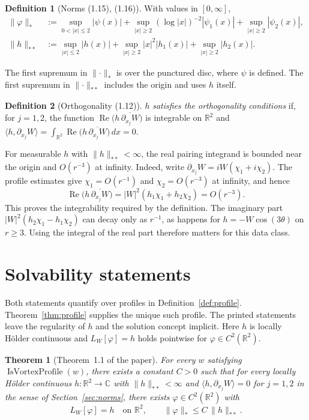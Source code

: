 \documentclass[11pt]{amsart}
\newtheorem{theorem}{Theorem}
\theoremstyle{definition}
\newtheorem{definition}{Definition}[section]
\newcommand{\C}{\mathbb{C}}
\newcommand{\R}{\mathbb{R}}
\renewcommand{\Re}{\operatorname{Re}}
\newcommand{\nstar}[1]{\lVert #1\rVert_{*}}
\newcommand{\nss}[1]{\lVert #1\rVert_{**}}
\newcommand{\ip}[2]{\langle #1,#2\rangle}
\newcommand{\vprofile}{\operatorname{IsVortexProfile}}
\begin{document}
\begin{definition}[Norms (1.15), (1.16)]
With values in $[0,\infty]$,
\begin{align*}
  \nstar{\varphi} &:= \sup_{0<|x|\le 2} |\psi(x)|
     + \sup_{|x|\ge 2} (\log|x|)^{-2} |\psi_1(x)| + \sup_{|x|\ge 2} |\psi_2(x)|,\\
  \nss{h} &:= \sup_{|x|\le 2} |h(x)| + \sup_{|x|\ge 2} |x|^2 |h_1(x)| + \sup_{|x|\ge 2} |h_2(x)|.
\end{align*}
\end{definition}

\noindent
The first supremum in $\nstar{\cdot}$ is over the punctured disc, where $\psi$ is defined.
The first supremum in $\nss{\cdot}$ includes the origin and uses $h$ itself.

\begin{definition}[Orthogonality (1.12)]
$h$ \emph{satisfies the orthogonality conditions} if, for $j = 1, 2$, the function
$\Re\bigl(h\,\overline{\partial_{x_j} W}\bigr)$ is integrable on $\R^2$ and
$\ip{h}{\partial_{x_j} W} = \int_{\R^2} \Re\bigl(h\,\overline{\partial_{x_j} W}\bigr)\,dx = 0$.
\end{definition}

\noindent
For measurable $h$ with $\nss{h}<\infty$, the real pairing integrand is bounded
near the origin and $O(r^{-3})$ at infinity. Indeed, write
$\partial_{x_j}W=iW(\chi_1+i\chi_2)$. The profile estimates give
$\chi_1=O(r^{-1})$ and $\chi_2=O(r^{-3})$ at infinity, and hence
\[
   \Re\bigl(h\,\overline{\partial_{x_j}W}\bigr)
      = |W|^2(h_1\chi_1+h_2\chi_2)=O(r^{-3}).
\]
This proves the integrability required by the definition. The imaginary part
$|W|^2(h_2\chi_1-h_1\chi_2)$ can decay only as $r^{-1}$, as happens for
$h=-W\cos(3\theta)$ on $r\ge3$. Using the integral of the real part therefore
matters for this data class.

\section{Solvability statements}\label{sec:theorems}

Both statements quantify over profiles in Definition~\ref{def:profile}.
Theorem~\ref{thm:profile} supplies the unique such profile. The printed
statements leave the regularity of $h$ and the solution concept implicit.
Here $h$ is locally H\"older continuous and $L_W[\varphi]=h$ holds pointwise
for $\varphi\in C^2(\R^2)$.

\begin{theorem}[Theorem~1.1 of the paper]\label{thm:A}
For every $w$ satisfying $\vprofile(w)$, there exists a constant $C>0$ such
that for every locally H\"older continuous $h\colon\R^2\to\C$ with
$\nss{h}<\infty$ and $\ip{h}{\partial_{x_j}W}=0$ for $j=1,2$ in the sense of
Section~\ref{sec:norms}, there exists $\varphi\in C^2(\R^2)$ with
\[
     L_W[\varphi]=h \quad\text{on }\R^2, \qquad
     \nstar{\varphi}\le C\,\nss{h}. \tag{1.17}
\]
\end{theorem}
\end{document}
